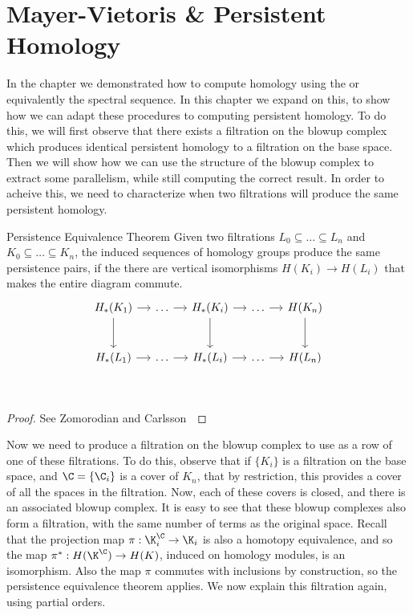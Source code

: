 \chapter{Mayer-Vietoris \& Persistent Homology}
In the chapter we demonstrated how to compute homology using the \mvb{} or equivalently the \mv spectral sequence. In this chapter we expand on this, to show how we can adapt these procedures to computing persistent homology. To do this, we will first observe that there exists a filtration on the blowup complex which produces identical persistent homology to a filtration on the base space. Then we will show how we can use the structure of the blowup complex to extract some parallelism, while still computing the correct result. In order to acheive this, we need to characterize when two filtrations will produce the same persistent homology. 
\begin{theorem}{Persistence Equivalence Theorem}
    Given two filtrations $L_0 \subseteq \ldots \subseteq L_n$ and
    $K_0 \subseteq \ldots \subseteq K_n$, the induced sequences of homology
    groups produce the same persistence pairs,
    if the there are vertical isomorphisms $H(K_i) \to H(L_i)$ that makes the entire diagram commute.
\[
\begin{tikzcd}[row sep=large, column sep=small]
    H_*(K_1) \arrow{r}\arrow{d} & \ldots \arrow{r} & H_*(K_i)  \arrow{r}\arrow{d} & \ldots \arrow{r} & H(K_n) \arrow{d} \\
    H_*(L_1) \arrow{r} & \ldots \arrow{r} & H_*(L_i)  \arrow{r} & \ldots \arrow{r} & H(L_n) \\
\end{tikzcd}
\]
\end{theorem}
\begin{proof}
See Zomorodian and Carlsson~\cite{zc-cph-05}
\end{proof}
Now we need to produce a filtration on the blowup complex to use as a row of one of these filtrations. To do this, observe that if $\{K_i\}$ is a filtration on the base space, and $\C =\{ \C_i \}$ is a cover of $K_n$, that by restriction, this provides a cover of all the spaces in the filtration. Now, each of these covers is closed, and there is an associated blowup complex. It is easy to see that these blowup complexes also form a filtration, with the same number of terms as the original space. Recall that the projection map $\pi: \K_i^\C \to \K_i$ is also a homotopy equivalence, and so the map $\pi^*: H(\K^\C) \to H(K)$, induced on homology modules, is an isomorphism. Also the map $\pi$ commutes with inclusions by construction, so  the persistence equivalence theorem applies. We now explain this filtration again, using partial orders.

